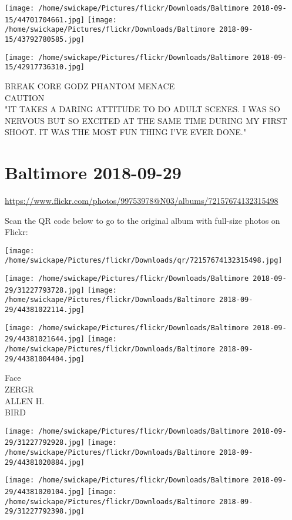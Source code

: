 \documentclass[10pt,letterpaper]{article}
\begin{document}
\texttt{[image: /home/swickape/Pictures/flickr/Downloads/Baltimore 2018-09-15/44701704661.jpg]}
\texttt{[image: /home/swickape/Pictures/flickr/Downloads/Baltimore 2018-09-15/43792780585.jpg]}

\texttt{[image: /home/swickape/Pictures/flickr/Downloads/Baltimore 2018-09-15/42917736310.jpg]}

BREAK CORE GODZ PHANTOM MENACE\\
CAUTION\\
"IT TAKES A DARING ATTITUDE TO DO ADULT SCENES.  I WAS SO NERVOUS BUT SO EXCITED AT THE SAME TIME DURING MY FIRST SHOOT.  IT WAS THE MOST FUN THING I'VE EVER DONE."
\pagebreak

\section*{Baltimore 2018-09-29}

\url{https://www.flickr.com/photos/99753978@N03/albums/72157674132315498}

Scan the QR code below to go to the original album with full-size photos on Flickr:

\texttt{[image: /home/swickape/Pictures/flickr/Downloads/qr/72157674132315498.jpg]}
\pagebreak

\texttt{[image: /home/swickape/Pictures/flickr/Downloads/Baltimore 2018-09-29/31227793728.jpg]}
\texttt{[image: /home/swickape/Pictures/flickr/Downloads/Baltimore 2018-09-29/44381022114.jpg]}

\texttt{[image: /home/swickape/Pictures/flickr/Downloads/Baltimore 2018-09-29/44381021644.jpg]}
\texttt{[image: /home/swickape/Pictures/flickr/Downloads/Baltimore 2018-09-29/44381004404.jpg]}

Face\\
ZERGR\\
ALLEN H.\\
BIRD
\pagebreak

\texttt{[image: /home/swickape/Pictures/flickr/Downloads/Baltimore 2018-09-29/31227792928.jpg]}
\texttt{[image: /home/swickape/Pictures/flickr/Downloads/Baltimore 2018-09-29/44381020884.jpg]}

\texttt{[image: /home/swickape/Pictures/flickr/Downloads/Baltimore 2018-09-29/44381020104.jpg]}
\texttt{[image: /home/swickape/Pictures/flickr/Downloads/Baltimore 2018-09-29/31227792398.jpg]}
\end{document}
